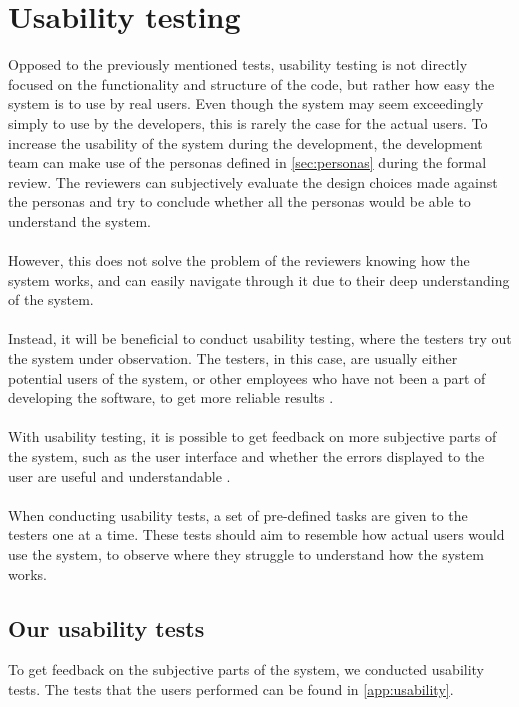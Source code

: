 \section{Usability testing} \label{sec:usability-test-section}
Opposed to the previously mentioned tests, usability testing is not directly focused on the functionality and structure of the code, but rather how easy the system is to use by real users.
Even though the system may seem exceedingly simply to use by the developers, this is rarely the case for the actual users.
To increase the usability of the system during the development, the development team can make use of the personas defined in \autoref{sec:personas} during the formal review.
The reviewers can subjectively evaluate the design choices made against the personas and try to conclude whether all the personas would be able to understand the system.
\\\\
However, this does not solve the problem of the reviewers knowing how the system works, and can easily navigate through it due to their deep understanding of the system.
\\\\
Instead, it will be beneficial to conduct usability testing, where the testers try out the system under observation.
The testers, in this case, are usually either potential users of the system, or other employees who have not been a part of developing the software, to get more reliable results \cite{SoftwareTesting}.
\\\\
With usability testing, it is possible to get feedback on more subjective parts of the system, such as the user interface and whether the errors displayed to the user are useful and understandable \cite{SoftwareTesting}.
\\\\
When conducting usability tests, a set of pre-defined tasks are given to the testers one at a time.
These tests should aim to resemble how actual users would use the system, to observe where they struggle to understand how the system works.

\subsection{Our usability tests}
To get feedback on the subjective parts of the system, we conducted usability tests.
The tests that the users performed can be found in \autoref{app:usability}.

